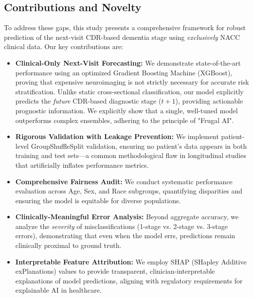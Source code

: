 \documentclass[preprint,12pt]{elsarticle}
\begin{document}
\subsection{Contributions and Novelty}

To address these gaps, this study presents a comprehensive framework for robust prediction of the next-visit CDR-based dementia stage using \textit{exclusively} NACC clinical data. Our key contributions are:

\begin{itemize}
    \item \textbf{Clinical-Only Next-Visit Forecasting:} We demonstrate state-of-the-art performance using an optimized Gradient Boosting Machine (XGBoost), proving that expensive neuroimaging is not strictly necessary for accurate risk stratification. Unlike static cross-sectional classification, our model explicitly predicts the \textit{future} CDR-based diagnostic stage ($t+1$), providing actionable prognostic information. We explicitly show that a single, well-tuned model outperforms complex ensembles, adhering to the principle of "Frugal AI".

    \item \textbf{Rigorous Validation with Leakage Prevention:} We implement patient-level GroupShuffleSplit validation, ensuring no patient's data appears in both training and test sets---a common methodological flaw in longitudinal studies that artificially inflates performance metrics.

    \item \textbf{Comprehensive Fairness Audit:} We conduct systematic performance evaluation across Age, Sex, and Race subgroups, quantifying disparities and ensuring the model is equitable for diverse populations.

    \item \textbf{Clinically-Meaningful Error Analysis:} Beyond aggregate accuracy, we analyze the \textit{severity} of misclassifications (1-stage vs. 2-stage vs. 3-stage errors), demonstrating that even when the model errs, predictions remain clinically proximal to ground truth.

    \item \textbf{Interpretable Feature Attribution:} We employ SHAP (SHapley Additive exPlanations) values to provide transparent, clinician-interpretable explanations of model predictions, aligning with regulatory requirements for explainable AI in healthcare.
\end{itemize}
\end{document}
